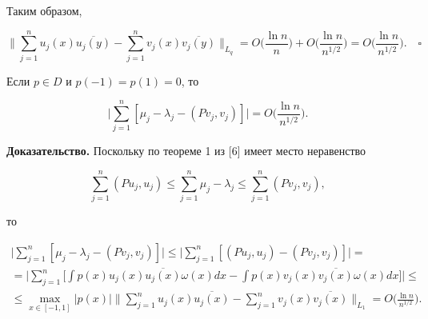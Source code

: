 Таким образом,


$$


\bigg\|\sum_{j=1}^n u_j(x)\overline{u_j(y)}-\sum_{j=1}^n v_j(x)


\overline{v_j(y)}\bigg\|_{L_q}=


O\bigg(\frac{\ln n}n\bigg)+O\bigg(\frac{\ln n}{n^{1/2}}\bigg)=


O\bigg(\frac{\ln n}{n^{1/2}}\bigg).\quad\square


$$





\begin{cornonum} Если $p\in D$ и $p(-1)=p(1)=0$, то


$$


\bigg|\sum_{j=1}^n [\mu_j-\lambda_j-(Pv_j,v_j)]\bigg|=


O\bigg(\frac{\ln n}{n^{1/2}}\bigg).


$$


\end{cornonum}





{\bf Доказательство.} Поскольку по теореме 1 из [6] имеет место неравенство


$$


\sum_{j=1}^n(Pu_j,u_j)\le\sum_{j=1}^n \mu_j-\lambda_j\le\sum_{j=1}^n(Pv_j,v_j),


$$


то


\begin{multline*}


\bigg|\sum_{j=1}^n [\mu_j-\lambda_j-(Pv_j,v_j)]\bigg|\le


\bigg|\sum_{j=1}^n[(Pu_j,u_j)-(Pv_j,v_j)]\bigg|= \\


%


=\bigg|\sum_{j=1}^n\bigg[\int p(x)u_j(x)\overline{u_j(x)}\omega(x)dx-


\int p(x)v_j(x)\overline{v_j(x)}\omega(x)dx\bigg]\bigg|\le \\


%


\le \max_{x\in[-1,1]}|p(x)|


\bigg\|\sum_{j=1}^n u_j(x)\overline{u_j(x)}-


\sum_{j=1}^n v_j(x)\overline{v_j(x)}\bigg\|_{L_1}


=O\bigg(\frac{\ln n}{n^{1/2}}\bigg).


\end{multline*}





